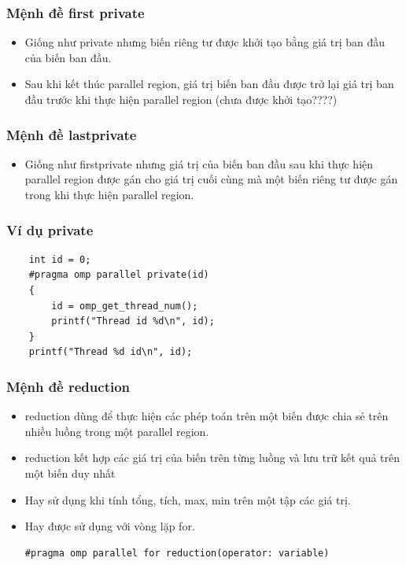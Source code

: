 \documentclass[14pt, a4paper]{article}
\numberwithin{equation}{section}
\numberwithin{figure}{section}
\numberwithin{dl}{section}
\numberwithin{md}{section}
\numberwithin{bd}{section}
\numberwithin{dn}{section}
\numberwithin{hq}{section}
\begin{document}
\subsubsection{Mệnh đề first private}

\begin{itemize}
    \item Giống như private nhưng biến riêng tư được khởi tạo bằng giá trị ban đầu của biến ban đầu.
    \item Sau khi kết thúc parallel region, giá trị biến ban đầu được trở lại giá trị ban đầu trước khi thực hiện parallel region (chưa được khởi tạo????)
\end{itemize}

\subsubsection{Mệnh đề lastprivate}

\begin{itemize}
    \item Giống như firstprivate nhưng giá trị của biến ban đầu sau khi thực hiện parallel region được gán cho giá trị cuối cùng mà một biến riêng tư được gán trong khi thực hiện parallel region.
\end{itemize}

\subsubsection{Ví dụ private}

\begin{verbatim}
    int id = 0;
    #pragma omp parallel private(id)
    {
        id = omp_get_thread_num();
        printf("Thread id %d\n", id);
    }
    printf("Thread %d id\n", id);
        \end{verbatim}

\subsubsection{Mệnh đề reduction}

\begin{itemize}
    \item reduction dùng để thực hiện các phép toán trên một biến được chia sẻ trên nhiều luồng trong một parallel region.
    \item reduction kết hợp các giá trị của biến trên từng luồng và lưu trữ kết quả trên một biến duy nhất
    \item Hay sử dụng khi tính tổng, tích, max, min trên một tập các giá trị.
    \item Hay được sử dụng với vòng lặp for.
    \begin{verbatim}
#pragma omp parallel for reduction(operator: variable)
    \end{verbatim}
\end{itemize}
\end{document}
